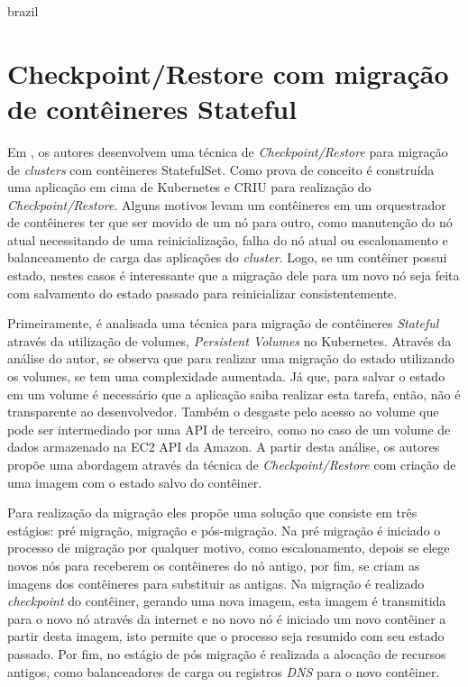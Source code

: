 \begin{otherlanguage*}{brazil}
\section{Checkpoint/Restore com migração de contêineres Stateful}

Em \cite{oh2018stateful}, os autores desenvolvem uma técnica de
\textit{Checkpoint/Restore} para migração de \textit{clusters} com contêineres
StatefulSet. Como prova de conceito é construída uma aplicação em cima de
Kubernetes e CRIU para realização do \textit{Checkpoint/Restore}. Alguns
motivos levam um contêineres em um orquestrador de contêineres ter que ser
movido de um nó para outro, como manutenção do nó atual necessitando de uma
reinicialização, falha do nó atual ou escalonamento e balanceamento de carga
das aplicações do \textit{cluster}. Logo, se um contêiner possui estado,
nestes casos é interessante que a migração dele para um novo nó seja feita
com salvamento do estado passado para reinicializar consistentemente.

Primeiramente, é analisada uma técnica para migração de contêineres
\textit{Stateful} através da utilização de volumes, \textit{Persistent Volumes}
no Kubernetes. Através da análise do autor, se observa que para realizar
uma migração do estado utilizando os volumes, se tem uma complexidade aumentada.
Já que, para salvar o estado em um volume é necessário que a aplicação saiba
realizar esta tarefa, então, não é transparente ao desenvolvedor. Também o
desgaste pelo acesso ao volume que pode ser intermediado por uma API de terceiro,
como no caso de um volume de dados armazenado na EC2 API da Amazon. A partir
desta análise, os autores propõe uma abordagem através da técnica de
\textit{Checkpoint/Restore} com criação de uma imagem com o estado salvo do contêiner.

Para realização da migração eles propõe uma solução que consiste em três
estágios: pré migração, migração e pós-migração. Na pré migração é iniciado
o processo de migração por qualquer motivo, como escalonamento, depois se elege
novos nós para receberem os contêineres do nó antigo, por fim, se criam as
imagens dos contêineres para substituir as antigas. Na migração é realizado
\textit{checkpoint} do contêiner, gerando uma nova imagem, esta imagem é
transmitida para o novo nó através da internet e no novo nó é iniciado um
novo contêiner a partir desta imagem, isto permite que o processo seja
resumido com seu estado passado. Por fim, no estágio de pós migração é
realizada a alocação de recursos antigos, como balanceadores de carga ou
registros \textit{DNS} para o novo contêiner.


\end{otherlanguage*}

